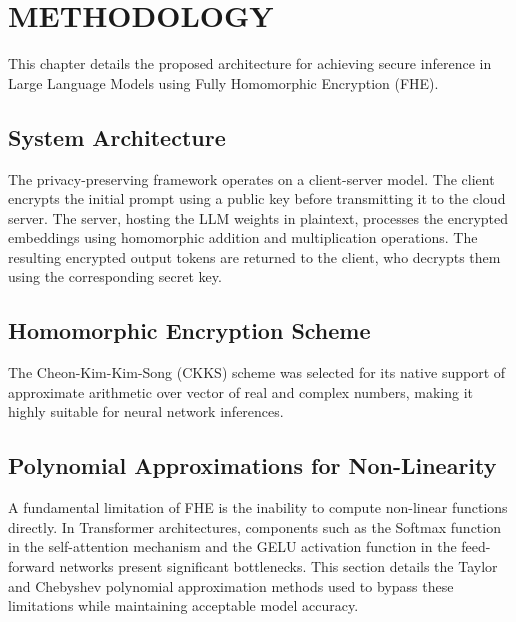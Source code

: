 \chapter{METHODOLOGY}

This chapter details the proposed architecture for achieving secure inference in Large Language Models using Fully Homomorphic Encryption (FHE).

\section{System Architecture}
The privacy-preserving framework operates on a client-server model. The client encrypts the initial prompt using a public key before transmitting it to the cloud server. The server, hosting the LLM weights in plaintext, processes the encrypted embeddings using homomorphic addition and multiplication operations. The resulting encrypted output tokens are returned to the client, who decrypts them using the corresponding secret key.

\section{Homomorphic Encryption Scheme}
The Cheon-Kim-Kim-Song (CKKS) scheme was selected for its native support of approximate arithmetic over vector of real and complex numbers, making it highly suitable for neural network inferences.

\section{Polynomial Approximations for Non-Linearity}
A fundamental limitation of FHE is the inability to compute non-linear functions directly. In Transformer architectures, components such as the Softmax function in the self-attention mechanism and the GELU activation function in the feed-forward networks present significant bottlenecks. This section details the Taylor and Chebyshev polynomial approximation methods used to bypass these limitations while maintaining acceptable model accuracy.